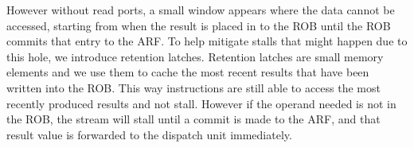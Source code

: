 However without read ports, a small window appears where the data cannot be accessed,
starting from when the result is placed in to the ROB until the ROB commits that 
entry to the ARF.  To help mitigate stalls that might happen due to this hole, 
we introduce retention latches.   Retention latches are small memory elements and 
we use them to cache the most recent results that have been written into the ROB.
This way instructions are still able to access the most recently produced results
and not stall.  However if the operand needed is not in the ROB, the stream will 
stall until a commit is made to the ARF, and that result value is forwarded to 
the dispatch unit immediately.

